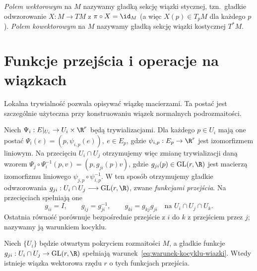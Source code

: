 \begin{definicja}
\emph{Polem wektorowym} na $M$ nazywamy gładką sekcję wiązki stycznej, tzn.\ gładkie
odwzorowanie $X\colon M\to TM$ z $\pi\circ X=\id_M$ (a więc $X(p)\in T_pM$ dla każdego
$p$). \emph{Polem kowektorowym} na $M$ nazywamy gładką sekcję wiązki kostycznej $T^*M$.
\end{definicja}

\section{Funkcje przejścia i operacje na wiązkach}

Lokalna trywialność pozwala opisywać wiązkę macierzami. Ta postać jest
szczególnie użyteczna przy konstruowaniu wiązek normalnych podrozmaitości.

Niech $\Psi_i:E|_{U_i}\to U_i\times\R^r$ będą trywializacjami.
Dla każdego $p\in U_i$ mają one postać $\Psi_i(e)=(p,\psi_{i,p}(e)),\ e\in E_p$,
gdzie $\psi_{i,p}:E_p\to\R^r$ jest izomorfizmem liniowym.
Na przecięciu $U_i\cap U_j$ otrzymujemy więc zmianę trywializacji daną wzorem $\Psi_j\circ\Psi_i^{-1}(p,v)=(p,g_{ji}(p)v)$,
gdzie $g_{ji}(p)\in\mathrm{GL}(r,\R)$ jest macierzą izomorfizmu
liniowego $\psi_{j,p}\circ\psi_{i,p}^{-1}$.
W ten sposób otrzymujemy gładkie odwzorowania $g_{ji}:U_i\cap U_j\longrightarrow\mathrm{GL}(r,\R)$,
zwane \emph{funkcjami przejścia}. Na przecięciach spełniają one
\begin{equation}\label{eq:warunek-kocyklu-wiazki}
g_{ii}=I,\qquad g_{ij}=g_{ji}^{-1},\qquad
g_{ki}=g_{kj}g_{ji}\quad\text{na }U_i\cap U_j\cap U_k.
\end{equation}
Ostatnia równość porównuje bezpośrednie przejście z $i$ do $k$
z przejściem przez $j$; nazywamy ją warunkiem kocyklu.


\begin{twierdzenie}
Niech $\{U_i\}$ będzie otwartym pokryciem rozmaitości $M$, a gładkie funkcje
$g_{ji}:U_i\cap U_j\to\mathrm{GL}(r,\R)$ spełniają
warunek~\eqref{eq:warunek-kocyklu-wiazki}. Wtedy istnieje
wiązka wektorowa rzędu $r$ o tych funkcjach przejścia.
\end{twierdzenie}

